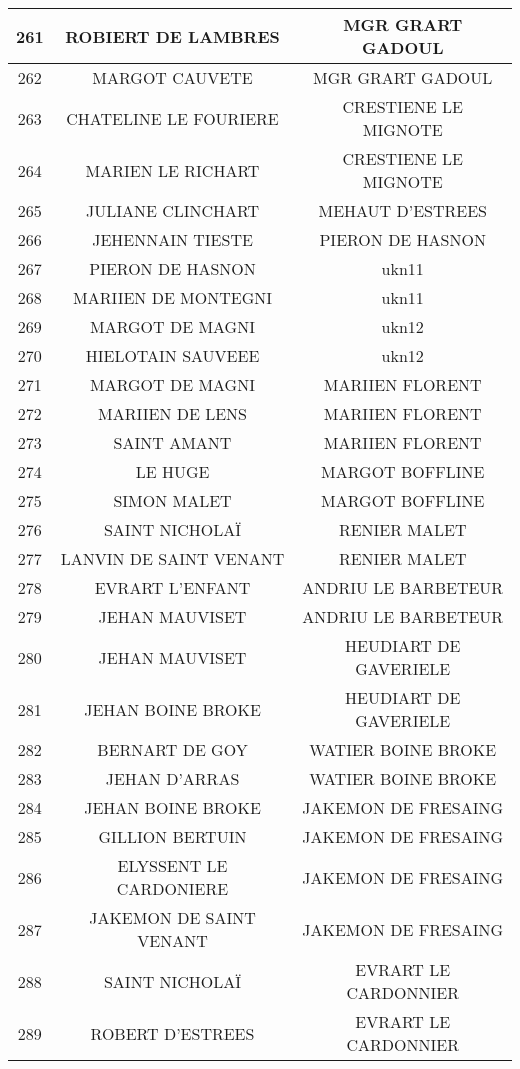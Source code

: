 \begin{center}
\begin{longtable}{|c|c|c|}
\hline	261	&	ROBIERT DE LAMBRES	&	MGR GRART GADOUL	\\
\hline	262	&	MARGOT CAUVETE	&	MGR GRART GADOUL	\\
\hline	263	&	CHATELINE LE FOURIERE	&	CRESTIENE LE MIGNOTE	\\
\hline	264	&	MARIEN LE RICHART	&	CRESTIENE LE MIGNOTE	\\
\hline	265	&	JULIANE CLINCHART	&	MEHAUT D'ESTREES	\\
\hline	266	&	JEHENNAIN TIESTE	&	PIERON DE HASNON	\\
\hline	267	&	PIERON DE HASNON	&	ukn11	\\
\hline	268	&	MARIIEN DE MONTEGNI	&	ukn11	\\
\hline	269	&	MARGOT DE MAGNI	&	ukn12	\\
\hline	270	&	HIELOTAIN SAUVEEE	&	ukn12	\\
\hline	271	&	MARGOT DE MAGNI	&	MARIIEN FLORENT	\\
\hline	272	&	MARIIEN DE LENS	&	MARIIEN FLORENT	\\
\hline	273	&	SAINT AMANT	&	MARIIEN FLORENT	\\
\hline	274	&	LE HUGE	&	MARGOT BOFFLINE	\\
\hline	275	&	SIMON MALET	&	MARGOT BOFFLINE	\\
\hline	276	&	SAINT NICHOLAÏ	&	RENIER MALET	\\
\hline	277	&	LANVIN DE SAINT VENANT	&	RENIER MALET	\\
\hline	278	&	EVRART L'ENFANT	&	ANDRIU LE BARBETEUR	\\
\hline	279	&	JEHAN MAUVISET	&	ANDRIU LE BARBETEUR	\\
\hline	280	&	JEHAN MAUVISET	&	HEUDIART DE GAVERIELE	\\
\hline	281	&	JEHAN BOINE BROKE	&	HEUDIART DE GAVERIELE	\\
\hline	282	&	BERNART DE GOY	&	WATIER BOINE BROKE	\\
\hline	283	&	JEHAN D'ARRAS	&	WATIER BOINE BROKE	\\
\hline	284	&	JEHAN BOINE BROKE	&	JAKEMON DE FRESAING	\\
\hline	285	&	GILLION BERTUIN	&	JAKEMON DE FRESAING	\\
\hline	286	&	ELYSSENT LE CARDONIERE	&	JAKEMON DE FRESAING	\\
\hline	287	&	JAKEMON DE SAINT VENANT	&	JAKEMON DE FRESAING	\\
\hline	288	&	SAINT NICHOLAÏ	&	EVRART LE CARDONNIER	\\
\hline	289	&	ROBERT D'ESTREES	&	EVRART LE CARDONNIER	\\

\end{longtable}
\end{center}
